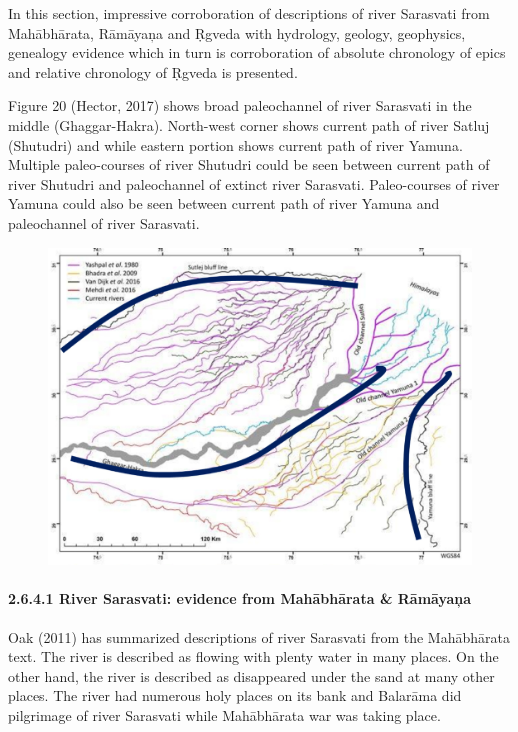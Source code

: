 In this section, impressive corroboration of descriptions of river Sarasvati from Mahābhārata, Rāmāyaņa and Ṛgveda with hydrology, geology, geophysics, genealogy evidence which in turn is corroboration of absolute chronology of epics and relative chronology of Ṛgveda is presented.

Figure 20 (Hector, 2017) shows broad paleochannel of river Sarasvati in the middle (Ghaggar-Hakra). North-west corner shows current path of river Satluj (Shutudri) and while eastern portion shows current path of river Yamuna. Multiple paleo-courses of river Shutudri could be seen between current path of river Shutudri and paleochannel of extinct river Sarasvati. Paleo-courses of river Yamuna could also be seen between current path of river Yamuna and paleochannel of river Sarasvati.

\begin{figure}[!htbp]
\includegraphics[scale=0.25]{"images/8-20.jpg"}
\caption{}\label{art8-fig20}
\end{figure}


\paragraph*{2.6.4.1 River Sarasvati: evidence from Mahābhārata \& Rāmāyaņa}

Oak (2011) has summarized descriptions of river Sarasvati from the Mahābhārata text. The river is described as flowing with plenty water in many places. On the other hand, the river is described as disappeared under the sand at many other places. The river had numerous holy places on its bank and Balarāma did pilgrimage of river Sarasvati while Mahābhārata war was taking place.

